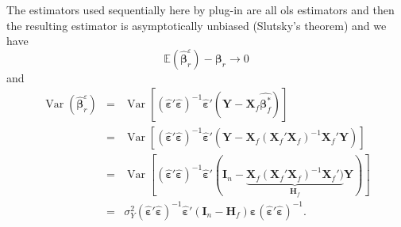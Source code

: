 \documentclass[12pt,a4paper]{report}
\begin{document}
The estimators used sequentially here by plug-in are all {\sc ols} estimators and then the resulting estimator is asymptotically unbiased (Slutsky's theorem) and we have
\begin{equation}
	\mathbb{E}(\hat{\boldsymbol{\beta}}_r^{\varepsilon})-\boldsymbol{\beta}_r \longrightarrow 0 
\end{equation}
and
\begin{eqnarray}
	\operatorname{Var}(\hat{\boldsymbol{\beta}}_r^{\varepsilon})&=& \operatorname{Var}[(\hat{\boldsymbol{\varepsilon}}'\hat{\boldsymbol{\varepsilon}})^{-1}\hat{\boldsymbol{\varepsilon}}'(\boldsymbol{Y}- \boldsymbol{X}_f\hat{\boldsymbol{\beta}^*_f})]\\
	&=&\operatorname{Var}[(\hat{\boldsymbol{\varepsilon}}'\hat{\boldsymbol{\varepsilon}})^{-1}\hat{\boldsymbol{\varepsilon}}'(\boldsymbol{Y}- \boldsymbol{X}_f(\boldsymbol{X}_f'\boldsymbol{X}_f)^{-1}\boldsymbol{X}_f'\boldsymbol{Y})] \\
	&=&\operatorname{Var}[(\hat{\boldsymbol{\varepsilon}}'\hat{\boldsymbol{\varepsilon}})^{-1}\hat{\boldsymbol{\varepsilon}}'(\boldsymbol{I}_n- \underbrace{\boldsymbol{X}_f(\boldsymbol{X}_f'\boldsymbol{X}_f)^{-1}\boldsymbol{X}_f')}_{\boldsymbol{H}_f}\boldsymbol{Y})] \\
	&=&\sigma^2_Y(\hat{\boldsymbol{\varepsilon}}'\hat{\boldsymbol{\varepsilon}})^{-1}\hat{\boldsymbol{\varepsilon}}'(\boldsymbol{I}_n-\boldsymbol{H}_f)\hat{\boldsymbol{\varepsilon}}(\hat{\boldsymbol{\varepsilon}}'\hat{\boldsymbol{\varepsilon}})^{-1}. \label{varpluginr}
\end{eqnarray}
\end{document}
